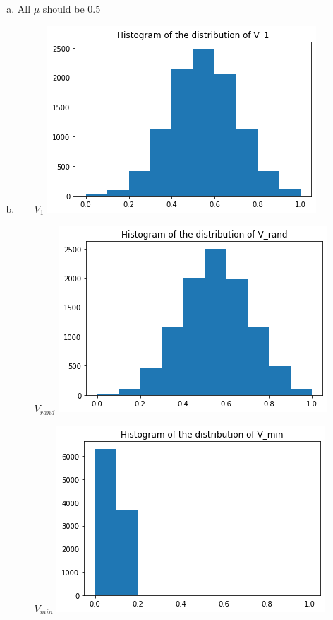 \documentclass{article}
\def\math#1{$#1$}
\begin{document}
\begin{enumerate}[a)]
    \item All \math{\mu} should be 0.5
    \item 
        \begin{itemize}
            \item [\math{V_1}] \includegraphics{1.10/2}
            \item [\math{V_{rand}}] \includegraphics{1.10/1}
            \item [\math{V_{min}}] \includegraphics{1.10/3}
        \end{itemize}

\end{enumerate}
\end{document}
